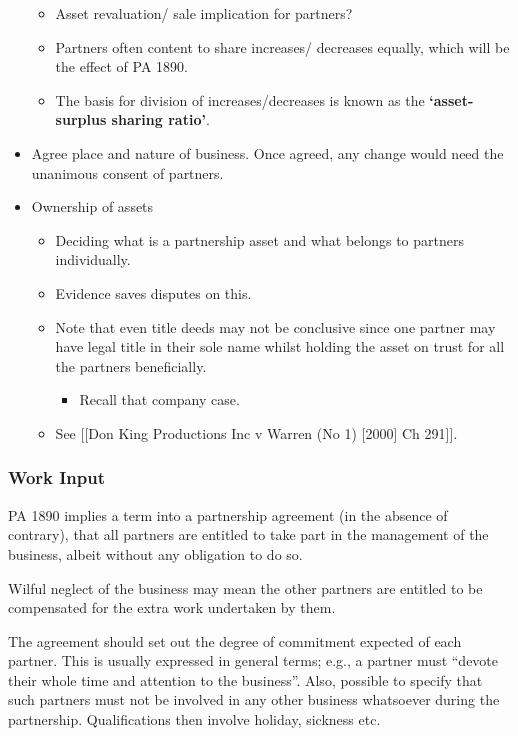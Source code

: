 \documentclass[
]{article}
\providecommand{\tightlist}{%
  \setlength{\itemsep}{0pt}\setlength{\parskip}{0pt}}
\begin{document}
\begin{itemize}
  \begin{itemize}
  \tightlist
  \item
    Asset revaluation/ sale implication for partners?
  \item
    Partners often content to share increases/ decreases equally, which
    will be the effect of PA 1890.
  \item
    The basis for division of increases/decreases is known as the
    \textbf{`asset-surplus sharing ratio'}.
  \end{itemize}
\item
  Agree place and nature of business. Once agreed, any change would need
  the unanimous consent of partners.
\item
  Ownership of assets

  \begin{itemize}
  \tightlist
  \item
    Deciding what is a partnership asset and what belongs to partners
    individually.
  \item
    Evidence saves disputes on this.
  \item
    Note that even title deeds may not be conclusive since one partner
    may have legal title in their sole name whilst holding the asset on
    trust for all the partners beneficially.

    \begin{itemize}
    \tightlist
    \item
      Recall that company case.
    \end{itemize}
  \item
    See {[}{[}Don King Productions Inc v Warren (No 1) {[}2000{]} Ch
    291{]}{]}.
  \end{itemize}
\end{itemize}

\hypertarget{work-input}{%
\subsubsection{Work Input}\label{work-input}}

PA 1890 implies a term into a partnership agreement (in the absence of
contrary), that all partners are entitled to take part in the management
of the business, albeit without any obligation to do so.

Wilful neglect of the business may mean the other partners are entitled
to be compensated for the extra work undertaken by them.

The agreement should set out the degree of commitment expected of each
partner. This is usually expressed in general terms; e.g., a partner
must ``devote their whole time and attention to the business''. Also,
possible to specify that such partners must not be involved in any other
business whatsoever during the partnership. Qualifications then involve
holiday, sickness etc.
\end{document}

